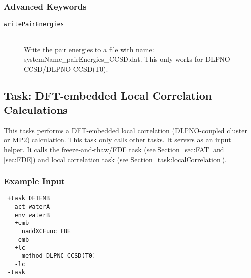 \documentclass[bibliography=totocnumbered,a4paper,10pt,oneside]{scrbook}
\begin{document}
\subsubsection{Advanced Keywords}
\begin{description}
  \item [\texttt{writePairEnergies}]\hfill \\
  Write the pair energies to a file with name: systemName\_pairEnergies\_CCSD.dat. This only works for
  DLPNO-CCSD/DLPNO-CCSD(T0).
\end{description}

\subsection{Task: DFT-embedded Local Correlation Calculations}
This tasks performs a DFT-embedded local correlation (DLPNO-coupled cluster or MP2) calculation.
This task only calls other tasks. It servers as an input helper. It calls the freeze-and-thaw/FDE task
(see Section~\ref{sec:FAT} and \ref{sec:FDE}) and local correlation task
(see Section~\ref{task:localCorrelation}).
\subsubsection{Example Input}
\begin{lstlisting}
 +task DFTEMB
   act waterA
   env waterB
   +emb
     naddXCFunc PBE
   -emb
   +lc
     method DLPNO-CCSD(T0)
   -lc
 -task
\end{lstlisting}
\end{document}
